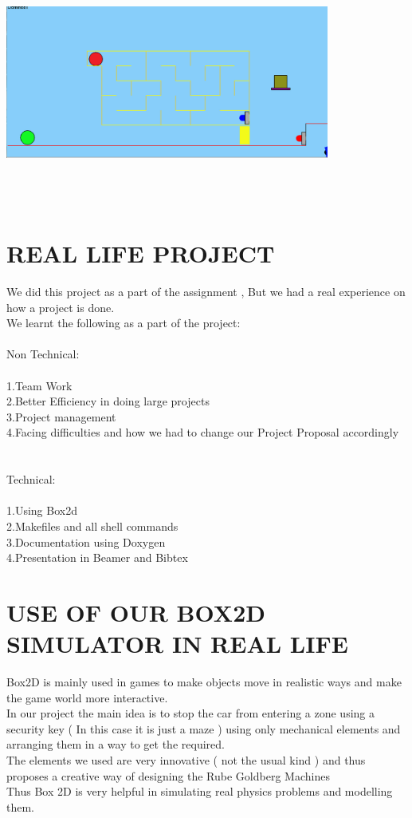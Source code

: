 \documentclass{article}
\begin{document}
{\includegraphics[width=0.8\textwidth, height=80mm]{8.png}
}
\clearpage
\section*{\huge{REAL LIFE PROJECT}}
\large{
We did this project as a part of the assignment , But we had a real experience on how a project is done.\\
We learnt  the following as a part of the project: \\
\\
{\huge Non Technical:}\\
\\
1.Team Work\\
2.Better Efficiency in doing large projects\\
3.Project management\\
4.Facing difficulties  and how we had to change our Project Proposal accordingly\\
\\
\\
{\huge Technical:}\\
\\
1.Using Box2d \\
2.Makefiles and all shell commands \\
3.Documentation using Doxygen\\
4.Presentation in Beamer and Bibtex\\
}
\clearpage
\section*{\huge{USE OF OUR BOX2D SIMULATOR IN REAL LIFE}}
\large{
Box2D is mainly used in games to make objects move in realistic ways and make the game world more interactive.\\
In our project the main idea is to stop the car from entering a zone using a security key ( In this case it is just a maze ) using only
mechanical elements and arranging them in a way to get the required.\\
The elements we used are very innovative ( not the usual kind ) and thus proposes a creative way of designing the Rube Goldberg Machines \\
Thus Box 2D is very helpful in simulating real physics problems and modelling them.\\
}
\clearpage
\end{document}

